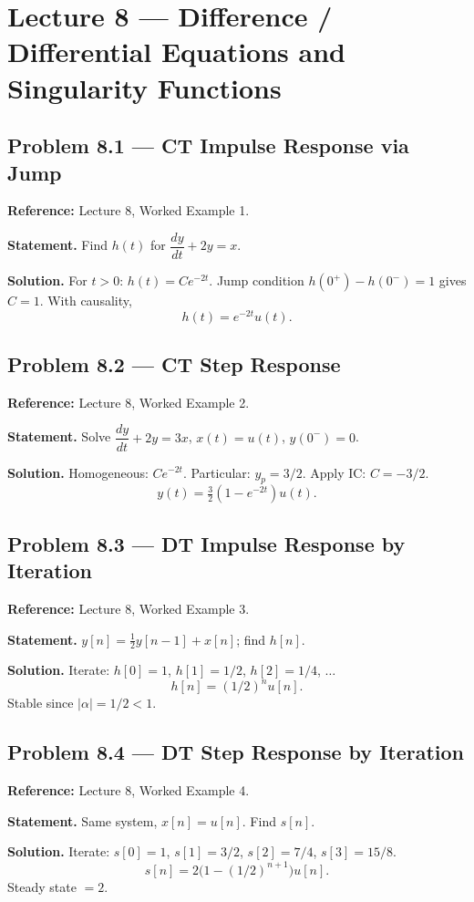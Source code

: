 \documentclass[11pt]{article}
\begin{document}
\section{Lecture 8 --- Difference / Differential Equations and Singularity Functions}

\subsection{Problem 8.1 --- CT Impulse Response via Jump}
\textbf{Reference:} Lecture 8, Worked Example 1.

\textbf{Statement.} Find $h(t)$ for $\dfrac{dy}{dt}+2y=x$.

\textbf{Solution.} For $t>0$: $h(t)=Ce^{-2t}$. Jump condition $h(0^+)-h(0^-)=1$ gives $C=1$. With causality,
\[
h(t) = e^{-2t}u(t).
\]

\subsection{Problem 8.2 --- CT Step Response}
\textbf{Reference:} Lecture 8, Worked Example 2.

\textbf{Statement.} Solve $\dfrac{dy}{dt}+2y=3x$, $x(t)=u(t)$, $y(0^-)=0$.

\textbf{Solution.} Homogeneous: $Ce^{-2t}$. Particular: $y_p=3/2$. Apply IC: $C=-3/2$.
\[
y(t) = \tfrac32(1-e^{-2t})u(t).
\]

\subsection{Problem 8.3 --- DT Impulse Response by Iteration}
\textbf{Reference:} Lecture 8, Worked Example 3.

\textbf{Statement.} $y[n]=\tfrac12 y[n-1]+x[n]$; find $h[n]$.

\textbf{Solution.} Iterate: $h[0]=1$, $h[1]=1/2$, $h[2]=1/4$, $\ldots$
\[
h[n] = (1/2)^n u[n].
\]
Stable since $|\alpha|=1/2<1$.

\subsection{Problem 8.4 --- DT Step Response by Iteration}
\textbf{Reference:} Lecture 8, Worked Example 4.

\textbf{Statement.} Same system, $x[n]=u[n]$. Find $s[n]$.

\textbf{Solution.} Iterate: $s[0]=1$, $s[1]=3/2$, $s[2]=7/4$, $s[3]=15/8$.
\[
s[n] = 2\bigl(1-(1/2)^{n+1}\bigr)u[n].
\]
Steady state $=2$.
\end{document}
